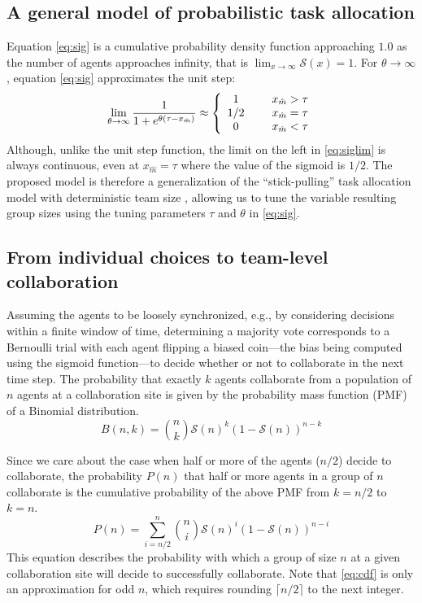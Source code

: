 \documentclass{TeXstyles/DARS/svmult}  %
\newcommand{\sig}{\mathcal{S}}
\newcommand{\ceil}[1]{\lceil#1\rceil}
\newcommand{\xm}{x_{\hat{m}}}
\begin{document}
\subsection{A general model of probabilistic task allocation}
Equation \eqref{eq:sig} is a cumulative probability density function approaching $1.0$ as the number of agents approaches infinity, that is $\lim_{x \to \infty}\sig(x)=1$. For $\theta \to \infty$, equation \eqref{eq:sig} approximates the unit step:
\begin{equation}
\lim_{\theta \to \infty} \frac{1}{1+e^{\theta(\tau-\xm)}}\approx
\left\{
\begin{array}{cc}
 1 & \hspace{.5cm} \xm>\tau \\
 1/2 & \hspace{.5cm} \xm=\tau \\
 0 & \hspace{.5cm} \xm<\tau
\end{array}
\right.\label{eq:siglim}
\end{equation}
Although, unlike the unit step function, the limit on the left in \eqref{eq:siglim} is always continuous, even at $\xm = \tau$ where the value of the sigmoid is $1/2$. The proposed model is therefore a generalization of the ``stick-pulling'' task allocation model with deterministic team size \cite{Lerman2001}, allowing us to tune the variable resulting group sizes using the tuning parameters $\tau$ and $\theta$ in \eqref{eq:sig}. 

\subsection{From individual choices to team-level collaboration}
Assuming the agents to be loosely synchronized, e.g., by considering decisions within a finite window of time, determining a majority vote corresponds to a Bernoulli trial with each agent flipping a biased coin---the bias being computed using the sigmoid function---to decide whether or not to collaborate in the next time step. The probability that exactly $k$ agents collaborate from a population of $n$ agents at a collaboration site is given by the probability mass function (PMF) of a Binomial distribution.
\begin{equation}
	B(n, k) = \binom{n}{k}\sig(n)^{k}\left(1 - \sig(n)\right)^{n - k}\label{eq:binomial}
\end{equation}

Since we care about the case when half or more of the agents ($n/2$) decide to collaborate, the probability $P(n)$ that half or more agents in a group of $n$ collaborate is the cumulative probability of the above PMF from $k = {n/2}$ to $k = n$. 
\begin{equation}
	P(n) = \sum\limits_{i={n/2}}^{n}\binom{n}{i}\sig(n)^{i}\left(1 - \sig(n)\right)^{n - i}\label{eq:cdf}
\end{equation}
This equation describes the probability with which a group of size $n$ at a given collaboration site will decide to successfully collaborate.  Note that \eqref{eq:cdf} is only an approximation for odd $n$, which requires rounding $\ceil{n/2}$ to the next integer. 
\end{document}
